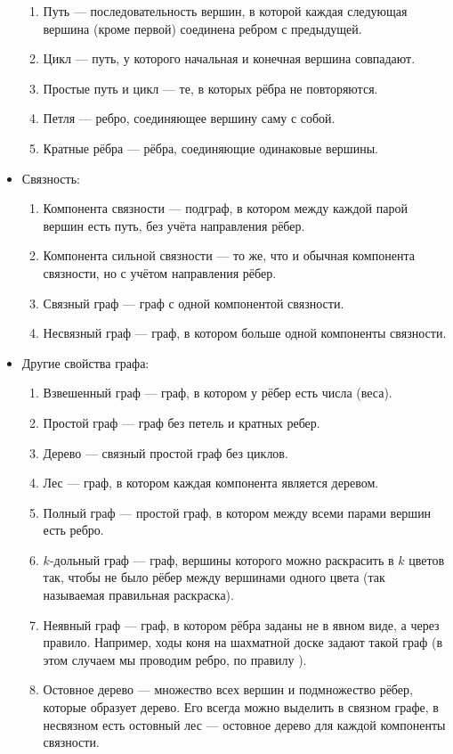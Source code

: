 \begin{itemize}
\begin{enumerate}
        \item Путь — последовательность вершин, в которой каждая следующая вершина (кроме первой) соединена ребром с предыдущей.
        \item Цикл — путь, у которого начальная и конечная вершина совпадают.
        \item Простые путь и цикл — те, в которых рёбра не повторяются.
        \item Петля — ребро, соединяющее вершину саму с собой.
        \item Кратные рёбра — рёбра, соединяющие одинаковые вершины.
    \end{enumerate}
    \item Связность:
    \begin{enumerate}
        \item Компонента связности — подграф, в котором между каждой парой вершин есть путь, без учёта направления рёбер.
        \item Компонента сильной связности — то же, что и обычная компонента связности, но с учётом направления рёбер.
        \item Связный граф — граф с одной компонентой связности.
        \item Несвязный граф — граф, в котором больше одной компоненты связности.
    \end{enumerate}
    \item Другие свойства графа:
    \begin{enumerate}
        \item Взвешенный граф — граф, в котором у рёбер есть числа (веса).
        \item Простой граф — граф без петель и кратных ребер.
        \item Дерево — связный простой граф без циклов.
        \item Лес — граф, в котором каждая компонента является деревом.
        \item Полный граф — простой граф, в котором между всеми парами вершин есть ребро.
        \item $k$-дольный граф — граф, вершины которого можно раскрасить в $k$ цветов так, чтобы не было рёбер между вершинами одного цвета (так называемая правильная раскраска).
        \item Неявный граф — граф, в котором рёбра заданы не в явном виде, а через правило. Например, ходы коня на шахматной доске задают такой граф (в этом случаем мы проводим ребро, по правилу ).
        \item Остовное дерево — множество всех вершин и подмножество рёбер, которые образует дерево. Его всегда можно выделить в связном графе, в несвязном есть остовный лес — остовное дерево для каждой компоненты связности.
    \end{enumerate}
\end{itemize}


